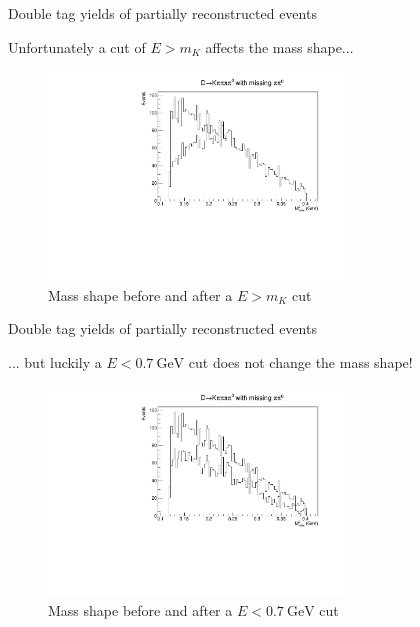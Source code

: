 \documentclass{beamer}
\begin{document}
\begin{frame}{Double tag yields of partially reconstructed events}
  \begin{center}
    Unfortunately a cut of $E > m_K$ affects the mass shape...
  \end{center}
  \vspace{-0.2cm}
  \begin{figure}
    \includegraphics[width = 0.7\textwidth]{Plots/Kpipipipi0_KaonEnergyLowerCut.pdf}
    \caption{Mass shape before and after a $E > m_K$ cut}
  \end{figure}
\end{frame}

\begin{frame}{Double tag yields of partially reconstructed events}
  \begin{center}
    ... but luckily a $E < \SI{0.7}{\giga\eV}$ cut does not change the mass shape!
  \end{center}
  \vspace{-0.2cm}
  \begin{figure}
    \includegraphics[width = 0.7\textwidth]{Plots/Kpipipipi0_KaonEnergyUpperCut.pdf}
    \caption{Mass shape before and after a $E < \SI{0.7}{\giga\eV}$ cut}
  \end{figure}
\end{frame}
\end{document}
